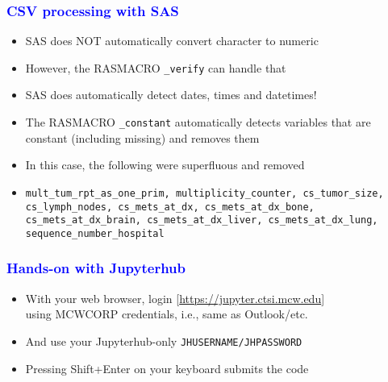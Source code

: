 \documentclass[11pt,pdftex,dvipsnames,usenames]{beamer}
\begin{document}
\begin{frame}[fragile]\frametitle{\bf\textcolor{blue}{CSV processing with SAS}}
\begin{itemize}
\item SAS does NOT automatically convert character to numeric
\item However, the RASMACRO \texttt{\_verify} can handle that
\item SAS does automatically detect dates, times and datetimes!
\item The RASMACRO \texttt{\_constant} automatically detects
variables that are constant (including missing) and
removes them
\item In this case, the following were superfluous and removed
\item \texttt{mult\_tum\_rpt\_as\_one\_prim, multiplicity\_counter, 
cs\_tumor\_size, cs\_lymph\_nodes, cs\_mets\_at\_dx, cs\_mets\_at\_dx\_bone, 
cs\_mets\_at\_dx\_brain, cs\_mets\_at\_dx\_liver, cs\_mets\_at\_dx\_lung, 
sequence\_number\_hospital}
\end{itemize}


\end{frame}

\begin{frame}[fragile]\frametitle{\bf\textcolor{blue}{Hands-on with Jupyterhub}}
\begin{itemize}
\item With your web browser, login
  \textcolor{PineGreen}{[\href{https://jupyter.ctsi.mcw.edu}{https://jupyter.ctsi.mcw.edu}]} \\
using MCWCORP credentials, i.e., same as Outlook/etc.
\item And use your Jupyterhub-only \texttt{JHUSERNAME/JHPASSWORD}
\item Pressing Shift+Enter on your keyboard submits the code
\end{itemize}

\end{frame}
\end{document}
